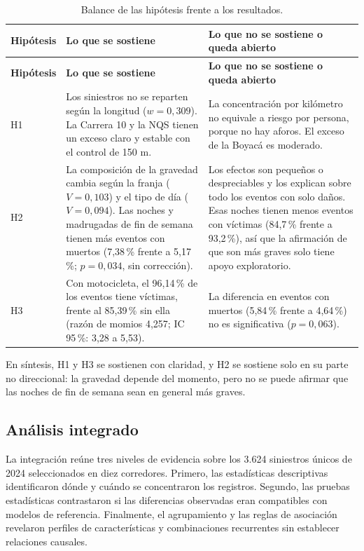 \documentclass[12pt,letterpaper]{article}
\begin{document}
\begingroup
\begin{longtable}{@{}L{0.12}L{0.44}L{0.44}@{}}
\caption{Balance de las hipótesis frente a los resultados.}\label{tab:analisis-hipotesis}\\
\toprule
\textbf{Hipótesis} & \textbf{Lo que se sostiene} & \textbf{Lo que no se sostiene o queda abierto}\\
\midrule
\endfirsthead
\toprule
\textbf{Hipótesis} & \textbf{Lo que se sostiene} & \textbf{Lo que no se sostiene o queda abierto}\\
\midrule
\endhead
H1 & Los siniestros no se reparten según la longitud ($w=0{,}309$). La Carrera 10 y la NQS tienen un exceso claro y estable con el control de 150 m. & La concentración por kilómetro no equivale a riesgo por persona, porque no hay aforos. El exceso de la Boyacá es moderado.\\
H2 & La composición de la gravedad cambia según la franja ($V=0{,}103$) y el tipo de día ($V=0{,}094$). Las noches y madrugadas de fin de semana tienen más eventos con muertos (7,38\,\% frente a 5,17\,\%; $p=0{,}034$, sin corrección). & Los efectos son pequeños o despreciables y los explican sobre todo los eventos con solo daños. Esas noches tienen menos eventos con víctimas (84,7\,\% frente a 93,2\,\%), así que la afirmación de que son más graves solo tiene apoyo exploratorio.\\
H3 & Con motocicleta, el 96,14\,\% de los eventos tiene víctimas, frente al 85,39\,\% sin ella (razón de momios 4,257; IC 95\,\%: 3,28 a 5,53). & La diferencia en eventos con muertos (5,84\,\% frente a 4,64\,\%) no es significativa ($p=0{,}063$).\\
\bottomrule
\end{longtable}
\endgroup

En síntesis, H1 y H3 se sostienen con claridad, y H2 se sostiene solo
en su parte no direccional: la gravedad depende del momento, pero no se
puede afirmar que las noches de fin de semana sean en general más
graves.

\subsection{Análisis integrado}


La integración reúne tres niveles de evidencia sobre los 3.624
siniestros únicos de 2024 seleccionados en diez corredores. Primero, las
estadísticas descriptivas identificaron dónde y cuándo se concentraron los
registros. Segundo, las pruebas estadísticas contrastaron si las diferencias
observadas eran compatibles con modelos de referencia. Finalmente, el
agrupamiento y las reglas de asociación revelaron perfiles de
características y combinaciones recurrentes sin establecer relaciones
causales.
\end{document}
